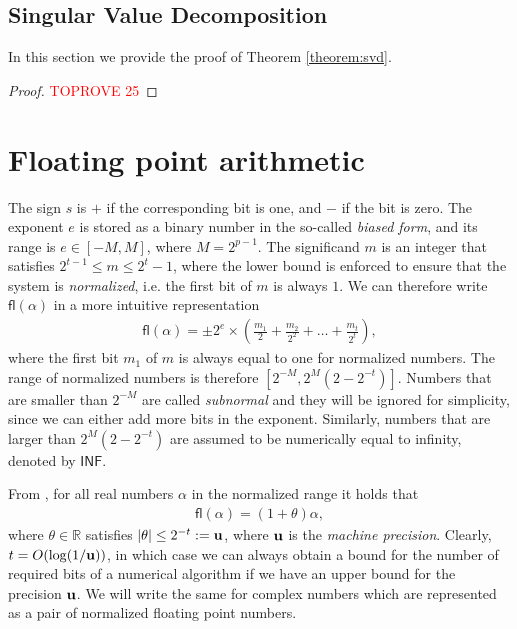 \documentclass{article}
\newcommand{\lpar}{\left(}
\newcommand{\rpar}{\right)}
\newcommand{\fl}{\boldsymbol{\mathsf{fl}}}
\newcommand{\umach}{\textbf{\textup{u}}}
\newcommand{\FLINF}{\mathsf{INF}}
\begin{document}
\subsection{Singular Value Decomposition}
\label{appendix:svd_analysis}

In this section we provide the proof of Theorem \ref{theorem:svd}. 
\begin{proof}\textcolor{red}{TOPROVE 25}\end{proof}







\section{Floating point arithmetic}
\label{appendix:floating_point_arithmetic}

The sign $s$ is $+$ if the corresponding bit is one, and $-$ if the bit is zero. The exponent $e$ is stored as a binary number in the so-called \textit{biased form}, and its range is $e\in[-M,M]$, where $M=2^{p-1}$. The significand $m$ is an integer that satisfies $2^{t-1}\leq m \leq 2^t-1$, where the lower bound is enforced to ensure that the system is \textit{normalized}, i.e. the first bit of $m$ is always $1$.
We can therefore write $\fl(\alpha)$ in a more intuitive representation
\begin{align*}
    \fl(\alpha) = \pm 2^{e}\times \lpar \tfrac{m_1}{2} + \tfrac{m_2}{2^2} + \ldots + \tfrac{m_t}{2^t} \rpar,
\end{align*}
where the first bit $m_1$ of $m$ is always equal to one for normalized numbers. The range of normalized numbers is therefore $[2^{-M},2^{M}(2-2^{-t})]$. Numbers that are smaller than $2^{-M}$ are called \textit{subnormal} and they will be ignored for simplicity, since we can either add more bits in the exponent. Similarly, numbers that are larger than $2^{M}(2-2^{-t})$ are assumed to be numerically equal to infinity, denoted by $\FLINF$. 

From \cite[Theorem 2.2]{higham2002accuracy},
for all real numbers $\alpha$ in the normalized range it holds that \begin{align*}
    \fl(\alpha) = (1+\theta)\alpha,
\end{align*}
where $\theta\in\mathbb{R}$ satisfies $|\theta|\leq 2^{-t}:=\umach$, where $\umach$ is the \textit{machine precision}. Clearly, $t=O(\log(1/\umach))$, in which case we can always obtain a bound for the number of required bits of a numerical algorithm if we have an upper bound for the precision $\umach$. We will write the same for complex numbers which are represented as a pair of normalized floating point numbers.
\end{document}
